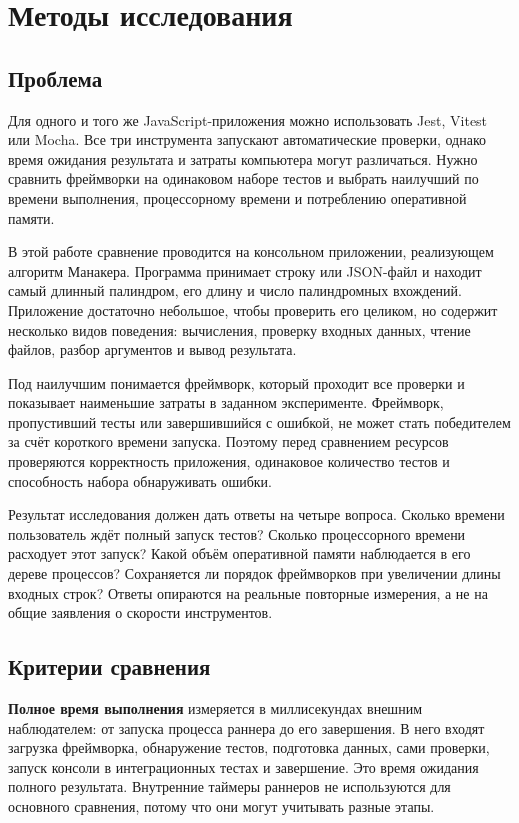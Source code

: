 \chapter{Методы исследования}\label{ch1}

\section{Проблема}
Для одного и того же JavaScript-приложения можно использовать Jest, Vitest или Mocha. Все три инструмента запускают автоматические проверки, однако время ожидания результата и затраты компьютера могут различаться. Нужно сравнить фреймворки на одинаковом наборе тестов и выбрать наилучший по времени выполнения, процессорному времени и потреблению оперативной памяти.

В этой работе сравнение проводится на консольном приложении, реализующем алгоритм Манакера. Программа принимает строку или JSON-файл и находит самый длинный палиндром, его длину и число палиндромных вхождений. Приложение достаточно небольшое, чтобы проверить его целиком, но содержит несколько видов поведения: вычисления, проверку входных данных, чтение файлов, разбор аргументов и вывод результата.

Под наилучшим понимается фреймворк, который проходит все проверки и показывает наименьшие затраты в заданном эксперименте. Фреймворк, пропустивший тесты или завершившийся с ошибкой, не может стать победителем за счёт короткого времени запуска. Поэтому перед сравнением ресурсов проверяются корректность приложения, одинаковое количество тестов и способность набора обнаруживать ошибки.

Результат исследования должен дать ответы на четыре вопроса. Сколько времени пользователь ждёт полный запуск тестов? Сколько процессорного времени расходует этот запуск? Какой объём оперативной памяти наблюдается в его дереве процессов? Сохраняется ли порядок фреймворков при увеличении длины входных строк? Ответы опираются на реальные повторные измерения, а не на общие заявления о скорости инструментов.

\section{Критерии сравнения}
\textbf{Полное время выполнения} измеряется в миллисекундах внешним наблюдателем: от запуска процесса раннера до его завершения. В него входят загрузка фреймворка, обнаружение тестов, подготовка данных, сами проверки, запуск консоли в интеграционных тестах и завершение. Это время ожидания полного результата. Внутренние таймеры раннеров не используются для основного сравнения, потому что они могут учитывать разные этапы.

